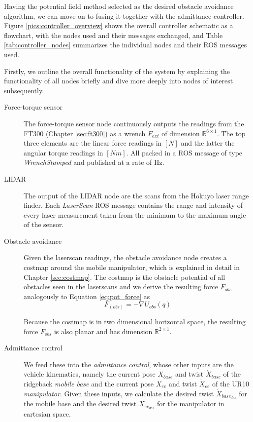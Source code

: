 Having the potential field method selected as the desired obstacle avoidance algorithm, we can move on to fusing it together with the admittance controller. Figure \ref{pics:controller_overview} shows the overall controller schematic as a flowchart, with the nodes used and their messages exchanged, and Table \ref{tab:controller_nodes} summarizes the individual nodes and their ROS messages used.

Firstly, we outline the overall functionality of the system by explaining the functionality of all nodes briefly and dive more deeply into nodes of interest subsequently.

\begin{description}
  \item[Force-torque sensor] The force-torque sensor node continuously outputs the readings from the FT300 (Chapter \ref{sec:ft300}) as a wrench $F_{ext}$ of dimension $\mathbb{R}^{6 \times 1}$. The top three elements are the linear force readings in $[N]$ and the latter the angular torque readings in $[Nm]$. All packed in a ROS message of type \emph{WrenchStamped} \citep{rosWrench} and published at a rate of \unit[100]{Hz}. 
  \item[LIDAR] The output of the LIDAR node are the scans from the Hokuyo laser range finder. Each \emph{LaserScan} ROS message \citep{rosLaserscan} contains the range and intensity of every laser measurement taken from the minimum to the maximum angle of the sensor.
  \item[Obstacle avoidance] Given the laserscan readings, the obstacle avoidance node creates a costmap \citep{rosCostmap} around the mobile manipulator, which is explained in detail in Chapter \ref{sec:costmap}. The costmap is the obstacle potential of all obstacles seen in the laserscans and we derive the resulting force $F_{obs}$ analogously to Equation \ref{eq:pot_force} as
  \begin{equation}
  F_(obs) = - \nabla U_{obs}(q)
  \end{equation}
  
  Because the costmap is in two dimensional horizontal space, the resulting force $F_{obs}$ is also planar and has dimension $\mathbb{R}^{2 \times 1}$. 
  
  \item[Admittance control] We feed these into the \emph{admittance control}, whose other inputs are the vehicle kinematics, namely the current pose $X_{base}$ \citep{rosPose} and twist $\dot{X}_{base}$ \citep{rosTwist} of the ridgeback \emph{mobile base} and the current pose $X_{ee}$ and twist $\dot{X}_{ee}$ of the UR10 \emph{manipulator}. Given these inputs, we calculate the desired twist $\dot{X}_{base_{des}}$ for the mobile base and the desired twist $\dot{X}_{ee_{des}}$ for the manipulator in cartesian space.
  

\end{description}
